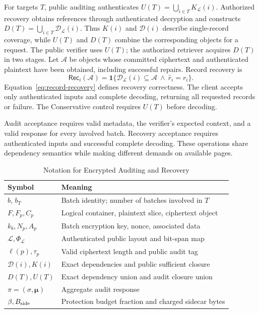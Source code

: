 \documentclass[10pt,journal]{IEEEtran}
\begin{document}
For targets $T$, public auditing authenticates
$U(T)=\bigcup_{i\in T}K_{\mathcal L}(i)$. Authorized recovery obtains
references through authenticated decryption and constructs
$D(T)=\bigcup_{i\in T}\mathcal D_{\mathcal L}(i)$.
Thus $K(i)$ and $\mathcal D(i)$ describe single-record coverage, while
$U(T)$ and $D(T)$ combine the corresponding objects for a request. The public
verifier uses $U(T)$; the authorized retriever acquires $D(T)$ in two stages.
Let $\mathcal A$ be objects whose committed ciphertext and authenticated
plaintext have been obtained, including successful repairs. Record recovery is
\begin{equation}\label{eq:record-recovery}
\mathsf{Rec}_i(\mathcal A)=
\mathbf1\{\mathcal D_{\mathcal L}(i)\subseteq\mathcal A
\ \land\ \widehat r_i=r_i\}.
\end{equation}
Equation~\eqref{eq:record-recovery} defines recovery correctness. The client
accepts only authenticated inputs and complete decoding, returning all requested
records or failure. The Conservative control requires $U(T)$ before decoding.

Audit acceptance requires valid metadata, the verifier's expected context,
and a valid response for every involved batch. Recovery acceptance requires
authenticated inputs and successful complete decoding. These operations
share dependency semantics while making different demands on available pages.

\begin{table}[t]\centering\small
\caption{Notation for Encrypted Auditing and Recovery}\label{tab:notation}
\begin{tabular}{@{}l>{\raggedright\arraybackslash}p{}@{}}\toprule
Symbol & Meaning\\\midrule
$b$, $b_T$ & Batch identity; number of batches involved in $T$\\
$F,F_p,C_p$ & Logical container, plaintext slice, ciphertext object\\
$k_b,N_p,A_p$ & Batch encryption key, nonce, associated data\\
$\mathcal L,\Phi_{\mathcal L}$ & Authenticated public layout and bit-span map\\
$\ell(p),\tau_p$ & Valid ciphertext length and public audit tag\\
$\mathcal D(i),K(i)$ & Exact dependencies and public sufficient closure\\
$D(T),U(T)$ & Exact dependency union and audit closure union\\
$\pi=(\sigma,\boldsymbol\mu)$ & Aggregate audit response\\
$\beta,B_{\rm side}$ & Protection budget fraction and charged sidecar bytes\\\bottomrule
\end{tabular}\end{table}
\end{document}
